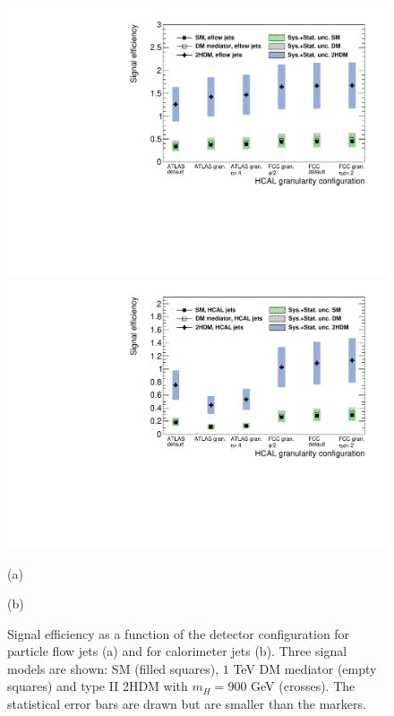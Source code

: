 \begin{figure}[h]
	\centering
	\begin{minipage}{.5\textwidth}
		\centering
		\includegraphics[trim={.65cm 0 0 0},clip,width=\linewidth]{./Figures/EffvsGran_PFjets_Opt.pdf}
	\end{minipage}%
	\begin{minipage}{.5\textwidth}
		\centering
		\includegraphics[trim={0 0 .65cm 0},clip,width=\linewidth]{./Figures/EffvsGran_CALOjets_Opt.pdf}
	\end{minipage}
	\begin{minipage}[t]{0.5\textwidth}
		\caption*{(a)}
	\end{minipage}%
	\hfill
	\begin{minipage}[t]{0.5\textwidth}
		\caption*{(b)}
	\end{minipage}
	\caption{Signal efficiency as a function of the detector configuration for particle flow jets (a) and for calorimeter jets (b). Three signal models are shown: SM (filled squares), $1$ TeV DM mediator (empty squares) and type II 2HDM with $m_H=900$ GeV (crosses). The statistical error bars are drawn but are smaller than the markers.}
	\label{fig:eff}
\end{figure} 
	



